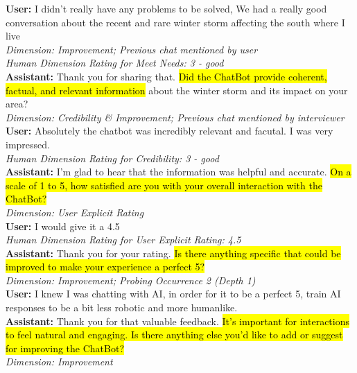 \begin{figure*}[h]
{\begin{tcolorbox}[colback=gray!1, colframe=black!50, title=Example User Experience Interview Session with Human Annotations]
    \textbf{User:} I didn't really have any problems to be solved, {We had a really good conversation about the recent and }\colorbox{teal!30!white}{rare winter storm affecting the south where I live}\\
    \textit{Dimension: Improvement; Previous chat mentioned by user}\\
    \textit{Human Dimension Rating for Meet Needs: 3 - good}\\

    \textbf{Assistant:} Thank you for sharing that. \hl{Did the ChatBot provide coherent, factual, and relevant information} about \colorbox{teal!30!white}{the winter storm and its impact on your area?}\\
    \textit{Dimension: Credibility \& Improvement; Previous chat mentioned by interviewer}\\

    \textbf{User:} Absolutely the chatbot was incredibly relevant and facutal. I was very impressed.\\
    \textit{Human Dimension Rating for Credibility: 3 - good}\\

    \textbf{Assistant:} I'm glad to hear that the information was helpful and accurate. \hl{On a scale of 1 to 5, how satisfied are you with your overall interaction with the ChatBot?}\\
    \textit{Dimension: User Explicit Rating}\\

    \textbf{User:} I would give it a 4.5\\
    \textit{Human Dimension Rating for User Explicit Rating: 4.5}\\

    \textbf{Assistant:} Thank you for your rating. \hl{Is there anything specific that could be improved to make your experience a perfect 5?}\\
    \textit{Dimension: Improvement; Probing Occurrence 2 (Depth 1)}\\

    \textbf{User:} I knew I was chatting with AI, in order for it to be a perfect 5, train AI responses to be a bit less robotic and more humanlike.\\

    \textbf{Assistant:} Thank you for that valuable feedback. \hl{It's important for interactions to feel natural and engaging. Is there anything else you'd like to add or suggest for improving the ChatBot?}\\
    \textit{Dimension: Improvement}\\


\end{tcolorbox}}
\end{figure*}
